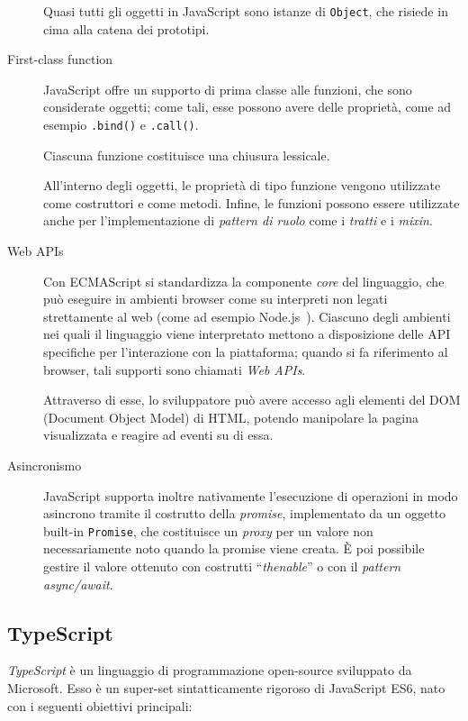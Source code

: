 \begin{description}
          Quasi tutti gli oggetti in JavaScript sono istanze di \texttt{Object}, che risiede in cima alla catena dei prototipi.

        \item[First-class function]
          JavaScript offre un supporto di prima classe alle funzioni, che sono considerate oggetti;
          come tali, esse possono avere delle proprietà, come ad esempio \texttt{.bind()} e \texttt{.call()}. %

          Ciascuna funzione costituisce una chiusura lessicale.

          All'interno degli oggetti, le proprietà di tipo funzione vengono utilizzate come costruttori e come metodi.
          Infine, le funzioni possono essere utilizzate anche per l'implementazione di \emph{pattern di ruolo} come i \emph{tratti} e i \emph{mixin}.

        \item[Web APIs]
          Con ECMAScript si standardizza la componente \emph{core} del linguaggio, che può eseguire in ambienti browser come su interpreti non legati strettamente al web (come ad esempio Node.js~\cite{5617064}).
          Ciascuno degli ambienti nei quali il linguaggio viene interpretato mettono a disposizione delle API specifiche per l'interazione con la piattaforma;
          quando si fa riferimento al browser, tali supporti sono chiamati \emph{Web APIs}.

          Attraverso di esse, lo sviluppatore può avere accesso agli elementi del DOM (Document Object Model) di HTML, potendo manipolare la pagina visualizzata e reagire ad eventi su di essa.

        \item[Asincronismo]
          JavaScript supporta inoltre nativamente l'esecuzione di operazioni in modo asincrono tramite il costrutto della \emph{promise}, implementato da un oggetto built-in \texttt{Promise},
          che costituisce un \emph{proxy} per un valore non necessariamente noto quando la promise viene creata.
          È poi possibile gestire il valore ottenuto con costrutti ``\emph{thenable}'' o con il \emph{pattern async/await}.
      \end{description}

    \subsection{TypeScript}\label{subsec:ts}
      \emph{TypeScript} è un linguaggio di programmazione open-source sviluppato da Microsoft.
      Esso è un super-set sintatticamente rigoroso di JavaScript ES6, nato con i seguenti obiettivi principali:

